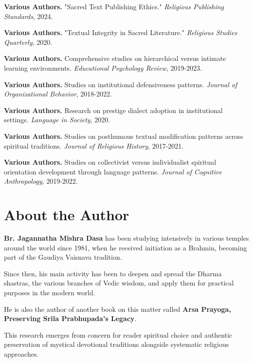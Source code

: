 \documentclass[11pt,twoside]{book}
\begin{document}
\textbf{\textbf{Various Authors.}} "Sacred Text Publishing Ethics." \emph{Religious Publishing Standards}, 2024.

\textbf{\textbf{Various Authors.}} "Textual Integrity in Sacred Literature." \emph{Religious Studies Quarterly}, 2020.

\textbf{\textbf{Various Authors.}} Comprehensive studies on hierarchical versus intimate learning environments. \emph{Educational Psychology Review}, 2019-2023.

\textbf{\textbf{Various Authors.}} Studies on institutional defensiveness patterns. \emph{Journal of Organizational Behavior}, 2018-2022.

\textbf{\textbf{Various Authors.}} Research on prestige dialect adoption in institutional settings. \emph{Language in Society}, 2020.

\textbf{\textbf{Various Authors.}} Studies on posthumous textual modification patterns across spiritual traditions. \emph{Journal of Religious History}, 2017-2021.

\textbf{\textbf{Various Authors.}} Studies on collectivist versus individualist spiritual orientation development through language patterns. \emph{Journal of Cognitive Anthropology}, 2019-2022.
\part*{About the Author}
\label{sec:org733c785}

\textbf{\textbf{Br. Jagannatha Mishra Dasa}} has been studying intensively in various temples around the world since 1981, when he received initiation as a Brahmin, becoming part of the Gaudiya Vaisnava tradition.

Since then, his main activity has been to deepen and spread the Dharma shastras, the various branches of Vedic wisdom, and apply them for practical purposes in the modern world. 

He is also the author of another book on this matter called \textbf{Arsa Prayoga, Preserving Srila Prabhupada's Legacy}.

This research emerges from concern for reader spiritual choice and authentic preservation of mystical devotional traditions alongside systematic religious approaches.
\end{document}
